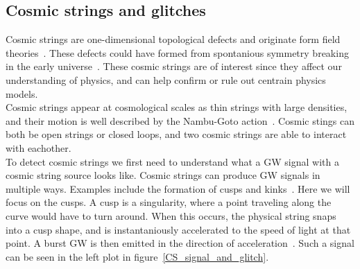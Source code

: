 \documentclass{article}
\newcommand\C[1]\null
\begin{document}
\begin{multicols}{2}
\subsection{Cosmic strings and glitches}
Cosmic strings are one-dimensional topological defects and originate form field theories~\cite{Meijer_2024}.
These defects could have formed from spontanious symmetry breaking in the early universe~\cite{schmitz2024gravitationalwavescosmicstrings}.
These cosmic strings are of interest since they affect our understanding of physics, and can help confirm or rule out centrain physics models. \\
\indent
Cosmic strings appear at cosmological scales as thin strings with large densities, and their motion is well described by the Nambu-Goto action~\cite{MairiSakellariadou}.
Cosmic stings can both be open strings or closed loops, and two cosmic strings are able to interact with eachother. \C{Needs citation}\\
\indent
To detect cosmic strings we first need to understand what a GW signal with a cosmic string source looks like.
Cosmic strings can produce GW signals in multiple ways. Examples include the formation of cusps and kinks~\cite{PhysRevLett126241102}. 
Here we will focus on the cusps. A cusp is a singularity, where a point traveling along the curve would have to turn around.
When this occurs, the physical string snaps into a cusp shape, and is instantaniously accelerated to the speed of light at that point.
A burst GW is then emitted in the direction of acceleration~\cite{Meijer_2024}.
Such a signal can be seen in the left plot in figure~\ref{CS_signal_and_glitch}.\\
\begin{figure}[H]
    \centering
    \begin{subfigure}[b]{0.49\columnwidth}

\end{subfigure}
\end{figure}
\end{multicols}
\end{document}
